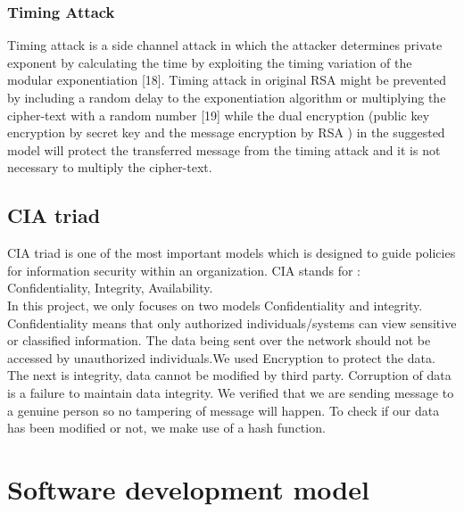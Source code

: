 \subsubsection{Timing Attack}
Timing attack is a side channel attack in which the attacker
determines private exponent by calculating the time by
exploiting the timing variation of the modular exponentiation
	[18]. Timing attack in original RSA might be prevented by
including a random delay to the exponentiation algorithm or
multiplying the cipher-text with a random number [19] while
the dual encryption (public key encryption by secret key and
the message encryption by RSA ) in the suggested model
will protect the transferred message from the timing attack and
it is not necessary to multiply the cipher-text.

\pagebreak
\subsection{CIA triad}
CIA triad is one of the most important models which is designed to guide policies
for information security within an organization.
CIA stands for :\\
Confidentiality,
Integrity,
Availability.\\
In this project, we only focuses on two models Confidentiality and 	integrity.\\
Confidentiality means that only authorized individuals/systems can view sensitive or classified information. The data being sent over the network should not be accessed by unauthorized individuals.We used Encryption to protect the data.\\

The next is integrity, data cannot be modified by third party. Corruption of data is a failure to maintain data integrity. We verified that we are sending message to a genuine person so no tampering of message will happen. To check if our data has been modified or not, we make use of a hash function.



\pagebreak
\section{Software development model}
